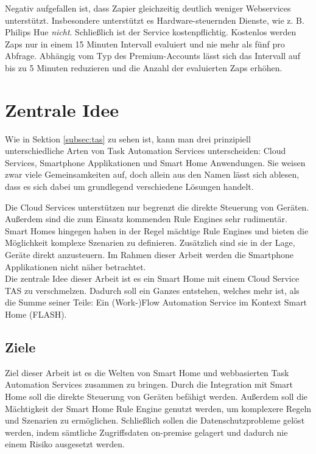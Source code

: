 Negativ aufgefallen ist, dass Zapier gleichzeitig deutlich weniger Webservices unterstützt. Insbesondere unterstützt es Hardware-steuernden Dienste, wie z. B. Philips Hue \textit{nicht}. Schließlich ist der Service kostenpflichtig. Kostenlos werden Zaps nur in einem 15 Minuten Intervall evaluiert und nie mehr als fünf pro Abfrage. Abhängig vom Typ des Premium-Accounts lässt sich das Intervall auf bis zu 5 Minuten reduzieren und die Anzahl der evaluierten Zaps erhöhen.

\section{Zentrale Idee}
\label{sec:idee}
Wie in Sektion \ref{subsec:tas} zu sehen ist, kann man drei prinzipiell unterschiedliche Arten von Task Automation Services unterscheiden: Cloud Services, Smartphone Applikationen und Smart Home Anwendungen. Sie weisen zwar viele Gemeinsamkeiten auf, doch allein aus den Namen lässt sich ablesen, dass es sich dabei um grundlegend verschiedene Lösungen handelt. 

Die Cloud Services unterstützen nur begrenzt die \glqq direkte\grqq{}  Steuerung von Geräten. Außerdem sind die zum Einsatz kommenden Rule Engines sehr rudimentär. Smart Homes hingegen haben in der Regel mächtige Rule Engines und bieten die Möglichkeit komplexe Szenarien zu definieren. Zusätzlich sind sie in der Lage, Geräte direkt anzusteuern. Im Rahmen dieser Arbeit werden die Smartphone Applikationen nicht näher betrachtet.\\

Die zentrale Idee dieser Arbeit ist es ein Smart Home mit einem Cloud Service TAS zu verschmelzen. Dadurch soll ein Ganzes entstehen, welches mehr ist, als die Summe seiner Teile: Ein (Work-)Flow Automation Service im Kontext Smart Home (FLASH).

\subsection{Ziele}
\label{sec:ziele}
Ziel dieser Arbeit ist es die Welten von Smart Home und webbasierten Task Automation Services zusammen zu bringen. Durch die Integration mit Smart Home soll die direkte Steuerung von Geräten befähigt werden. Außerdem soll die Mächtigkeit der Smart Home Rule Engine genutzt werden, um komplexere Regeln und Szenarien zu ermöglichen. Schließlich sollen die Datenschutzprobleme gelöst werden, indem sämtliche Zugriffsdaten on-premise gelagert und dadurch nie einem Risiko ausgesetzt werden.

